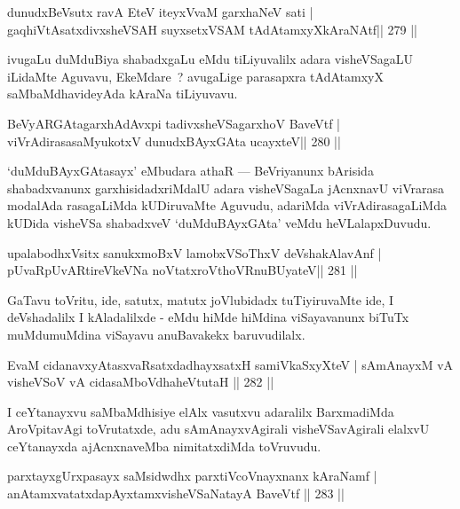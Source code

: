 \begin{shl}
dunudxBeVsutx ravA EteV iteyxVvaM garxhaNeV sati |
gaqhiVtAsatxdivxsheVSAH suyxsetxVSAM tAdAtamxyXkAraNAtf\hfill || 279 ||
\end{shl}

\begin{artha}
ivugaLu duMduBiya shabadxgaLu eMdu tiLiyuvalilx adara visheVSagaLU iLidaMte Aguvavu, EkeMdare~? avugaLige parasapxra tAdAtamxyX saMbaMdhavideyAda kAraNa tiLiyuvavu.
\end{artha}

\begin{shl}
BeVyARGAtagarxhAdAvx\s pi tadivxsheVSagarxhoV BaveVtf |
viVrAdirasasaMyukotxV dunudxBAyxGAta ucayxteV\hfill || 280 ||
\end{shl}

\begin{artha}
`duMduBAyxGAtasayx' eMbudara athaR  {\rm ---}  BeVriyanunx bArisida shabadxvanunx garxhisidadxriMdalU adara visheVSagaLa jAcnxnavU viVrarasa modalAda rasagaLiMda kUDiruvaMte Aguvudu, adariMda viVrAdirasagaLiMda kUDida visheVSa shabadxveV `duMduBAyxGAta' veMdu heVLalapxDuvudu.
\end{artha}


\begin{shl}
upalabodhxV\s sitx sanukxmoBxV lamobxVSoThxV deVshakAlavAnf |
pUvaRpUvARtireVkeVNa noVtatxroV\s thoVR\s nuBUyateV\hfill || 281 ||
\end{shl}

\begin{artha}
GaTavu toVritu, ide, satutx, matutx joVlubidadx tuTiyiruvaMte ide, I deVshadalilx I kAladalilxde - eMdu hiMde hiMdina viSayavanunx biTuTx muMdumuMdina viSayavu anuBavakekx baruvudilalx.
\end{artha}

\begin{shl}
EvaM cidanavxyAtasxvaRsatxdadhayxsatxH samiVkaSxyXteV |
sAmAnayxM vA visheVSoV vA cidasaMboVdhaheVtutaH \hfill || 282 ||
\end{shl}

\begin{artha}
I ceYtanayxvu saMbaMdhisiye elAlx vasutxvu adaralilx BarxmadiMda AroVpitavAgi toVrutatxde, adu sAmAnayxvAgirali visheVSavAgirali elalxvU ceYtanayxda ajAcnxnaveMba nimitatxdiMda toVruvudu.
\end{artha}

\begin{shl}
parxtayxgUrxpasayx saMsidwdhx parxtiVcoV\s nayxnanx kAraNamf |
anAtamxvatatxdapAyxtamxvisheVSaNatayA BaveVtf \hfill || 283 ||
\end{shl}

